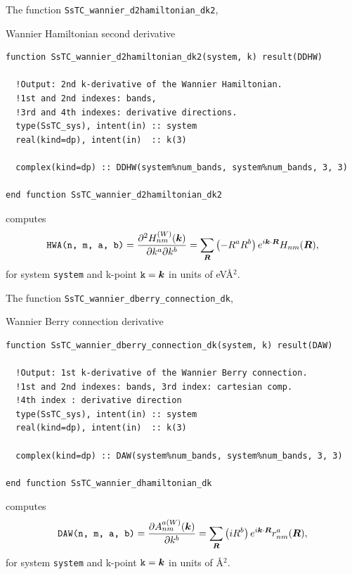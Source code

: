 \documentclass[10pt,a4paper]{article}
\begin{document}
The function \verb|SsTC_wannier_d2hamiltonian_dk2|,
\begin{codebox}{Wannier Hamiltonian second derivative}
\begin{lstlisting}[caption={Interface of ``Wannier Hamiltonian's 2nd derivative".},captionpos=b]
function SsTC_wannier_d2hamiltonian_dk2(system, k) result(DDHW)

  !Output: 2nd k-derivative of the Wannier Hamiltonian.
  !1st and 2nd indexes: bands,
  !3rd and 4th indexes: derivative directions.
  type(SsTC_sys), intent(in) :: system
  real(kind=dp), intent(in)  :: k(3)

  complex(kind=dp) :: DDHW(system%num_bands, system%num_bands, 3, 3)
  
end function SsTC_wannier_d2hamiltonian_dk2
\end{lstlisting}
\end{codebox}
computes
\begin{equation}
\verb|HWA(n, m, a, b)| = \frac{\partial^2 H_{nm}^{(W)}(\bm{k})}{\partial k^a \partial k^b} = \sum_{\bm{R}}\left(-R^aR^b \right) e^{i\bm{k}\cdot\bm{R}} H_{nm}(\bm{R}),
\end{equation}
for system \verb|system| and k-point $\verb|k| = \bm{k}$ in units of eV\r{A}$^2$.

The function \verb|SsTC_wannier_dberry_connection_dk|,
\begin{codebox}{Wannier Berry connection derivative}
\begin{lstlisting}[caption={Interface of ``Wannier Berry connection's derivative".},captionpos=b]
function SsTC_wannier_dberry_connection_dk(system, k) result(DAW)

  !Output: 1st k-derivative of the Wannier Berry connection.
  !1st and 2nd indexes: bands, 3rd index: cartesian comp.
  !4th index : derivative direction
  type(SsTC_sys), intent(in) :: system
  real(kind=dp), intent(in)  :: k(3)

  complex(kind=dp) :: DAW(system%num_bands, system%num_bands, 3, 3)
  
end function SsTC_wannier_dhamiltonian_dk
\end{lstlisting}
\end{codebox}
computes
\begin{equation}
\verb|DAW(n, m, a, b)| = \frac{\partial A_{nm}^{a(W)}(\bm{k})}{\partial k^b} = \sum_{\bm{R}}\left(iR^b \right) e^{i\bm{k}\cdot\bm{R}} r^a_{nm}(\bm{R}),
\end{equation}
for system \verb|system| and k-point $\verb|k| = \bm{k}$ in units of \r{A}$^2$.
\end{document}
